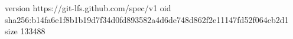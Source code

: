 version https://git-lfs.github.com/spec/v1
oid sha256:b14fa6e1f8b1b19d7f34d0fd893582a4d6de748d862f2e11147fd52f064cb2d1
size 133488
